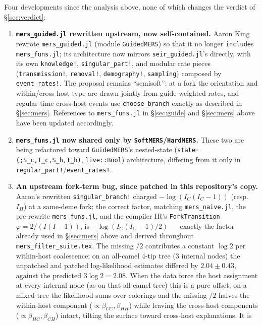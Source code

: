 \documentclass[11pt]{article}
\theoremstyle{plain}
\begin{document}
Four developments since the analysis above, none of which changes the verdict of
\S\ref{sec:verdict}:

\begin{enumerate}
\item \textbf{\texttt{mers\_guided.jl} rewritten upstream, now self-contained.} Aaron King
rewrote \texttt{mers\_guided.jl} (module \texttt{GuidedMERS}) so that it no longer
\texttt{include}s \texttt{mers\_funs.jl}; its architecture now mirrors
\texttt{seir\_guided.jl}'s directly, with its own \texttt{knowledge!}, \texttt{singular\_part!},
and modular rate pieces (\texttt{transmission!}, \texttt{removal!}, \texttt{demography!},
\texttt{sampling}) composed by \texttt{event\_rates!}. The proposal remains ``semisoft'': at a
fork the orientation and within/cross-host type are drawn jointly from guide-weighted rates, and
regular-time cross-host events use \texttt{choose\_branch} exactly as described in
\S\ref{sec:mers}. References to \texttt{mers\_funs.jl} in \S\ref{sec:guide} and \S\ref{sec:mers}
above have been updated accordingly.
\item \textbf{\texttt{mers\_funs.jl} now shared only by \texttt{SoftMERS}/\texttt{HardMERS}.}
These two are being refactored toward \texttt{GuidedMERS}'s nested-state
(\texttt{state=(;S\_c,I\_c,S\_h,I\_h)}, \texttt{live::Bool}) architecture, differing from it only
in \texttt{regular\_part!}/\texttt{event\_rates!}.
\item \textbf{An upstream fork-term bug, since patched in this repository's copy.} Aaron's
rewritten \texttt{singular\_branch!} charged $-\log(I_C(I_C-1))$ (resp.\ $I_H$) at a same-deme
fork; the correct factor, matching \texttt{mers\_naive.jl}, the pre-rewrite \texttt{mers\_funs.jl},
and the compiler IR's \texttt{ForkTransition} $\varphi=2/(I(I-1))$, is $-\log(I_C(I_C-1)/2)$ ---
exactly the factor already used in \S\ref{sec:mers} above and derived throughout
\texttt{mers\_filter\_suite.tex}. The missing $/2$ contributes a constant $\log 2$ per within-host
coalescence; on an all-camel 4-tip tree (3 internal nodes) the unpatched and patched
log-likelihood estimates differed by $2.04\pm0.43$, against the predicted $3\log 2=2.08$. When
the data force the host assignment at every internal node (as on that all-camel tree) this is a
pure offset; on a mixed tree the likelihood sums over colorings and the missing $/2$ halves the
within-host component ($\propto\beta_{CC},\beta_{HH}$) while leaving the cross-host components
($\propto\beta_{HC},\beta_{CH}$) intact, tilting the surface toward cross-host explanations. It is

\end{enumerate}
\end{document}
